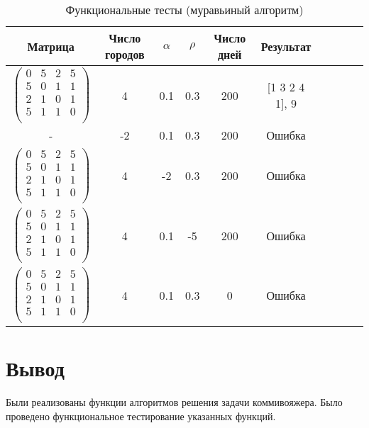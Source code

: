 \begin{center}
    \captionsetup{justification=raggedright,singlelinecheck=off}
    \begin{longtable}[c]{|c|c|c|c|c|c|c|c|c|c|}
    \caption{Функциональные тесты (муравьиный алгоритм)\label{tbl:func_test_ant}} \\ \hline
		Матрица & Число городов & $\alpha$ & $\rho$ & Число дней & Результат \\
		\hline
		$ \begin{pmatrix}
			0 & 5 & 2 & 5 \\
			5 & 0 & 1 & 1 \\
			2 & 1 & 0 & 1 \\
			5 & 1 & 1 & 0 \\
		\end{pmatrix}$ &
		4 &
		0.1 &
		0.3 &
		200 &
		[1 3 2 4 1], 9 \\
		\hline
		- &
		-2 &
		0.1 &
		0.3 &
		200 &
		Ошибка \\
		\hline
		$ \begin{pmatrix}
			0 & 5 & 2 & 5 \\
			5 & 0 & 1 & 1 \\
			2 & 1 & 0 & 1 \\
			5 & 1 & 1 & 0 \\
		\end{pmatrix}$ &
		4 &
		-2 &
		0.3 &
		200 &
		Ошибка \\
		\hline
		$ \begin{pmatrix}
			0 & 5 & 2 & 5 \\
			5 & 0 & 1 & 1 \\
			2 & 1 & 0 & 1 \\
			5 & 1 & 1 & 0 \\
		\end{pmatrix}$ &
		4 &
		0.1 &
		-5 &
		200 &
		Ошибка \\
		\hline
		$ \begin{pmatrix}
			0 & 5 & 2 & 5 \\
			5 & 0 & 1 & 1 \\
			2 & 1 & 0 & 1 \\
			5 & 1 & 1 & 0 \\
		\end{pmatrix}$ &
		4 &
		0.1 &
		0.3 &
		0 &
		Ошибка \\
		\hline
	\end{longtable}
\end{center}

\section{Вывод}

Были реализованы функции алгоритмов решения задачи коммивояжера. Было проведено функциональное тестирование указанных функций.